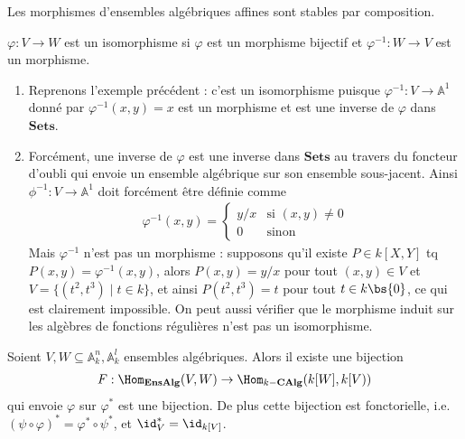         \begin{exo}
            Les morphismes d'ensembles algébriques affines sont stables par composition.
        \end{exo}
        \begin{defi}
            $\varphi : V \to W$ est un isomorphisme si $\varphi$ est un morphisme bijectif et $\varphi^{-1} : W \to V$ est un morphisme.
        \end{defi}
        \begin{expl}
            \begin{enumerate}
                \item Reprenons l'exemple précédent : c'est un isomorphisme puisque $\varphi^{-1} : V \to \mathbb{A}^1$ donné par $\varphi^{-1}(x,y) = x$ est un morphisme et est une inverse de $\varphi$ dans $\mathbf{Sets}$.
                \item Forcément, une inverse de $\varphi$ est une inverse dans $\mathbf{Sets}$ au travers du foncteur d'oubli qui envoie un ensemble algébrique sur son ensemble sous-jacent. Ainsi $\phi^{-1} : V \to \mathbb{A}^1$ doit forcément être définie comme
                \begin{align*}
                    \varphi^{-1}(x,y) = 
                    \begin{cases}
                        y/x & \text{si } (x,y) \neq 0 \\
                        0 & \text{sinon}
                    \end{cases}
                \end{align*}
                Mais $\varphi^{-1}$ n'est pas un morphisme : supposons qu'il existe $P \in k[X,Y]$ tq $P(x,y) = \varphi^{-1}(x,y)$, alors $P(x,y) = y/x$ pour tout $(x,y) \in V$ et $V = \{(t^2, t^3) \mid t \in k \}$, et ainsi $P(t^2, t^3) = t$ pour tout $t \in k \bs \{0\}$, ce qui est clairement impossible. On peut aussi vérifier que le morphisme induit sur les algèbres de fonctions régulières n'est pas un isomorphisme.
            \end{enumerate}
        \end{expl}
        \begin{theo}
            \label{theo115}
            Soient $V,W \subseteq \mathbb{A}_k^n, \mathbb{A}_k^l$ ensembles algébriques. Alors il existe une bijection
            \begin{align*}
                F : \Hom_{\mathbf{EnsAlg}}(V,W) \to \Hom_{k-\mathbf{CAlg}}(k[W], k[V))
            \end{align*} 
            qui envoie $\varphi$ sur $\varphi^*$ est une bijection. De plus cette bijection est fonctorielle, i.e. $(\psi \circ \varphi)^* = \varphi^* \circ \psi^*$, et $\id_V^* = \id_{k[V]}$.
        \end{theo}

